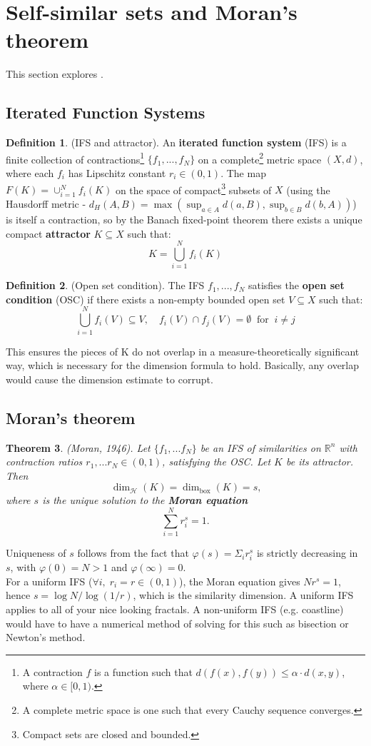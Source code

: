 \documentclass[11pt, a4paper]{article}
\theoremstyle{plain}
\newtheorem{theorem}{Theorem}[section]
\theoremstyle{definition}
\newtheorem{definition}[theorem]{Definition}
\theoremstyle{remark}
\newcommand{\Hd}{\dim_{\mathcal{H}}}     %
\newcommand{\Bd}{\dim_{\mathrm{box}}}    %
\begin{document}
\section{Self-similar sets and Moran's theorem}
This section explores \cite{fernandezmartinez2016moran}.
\subsection{Iterated Function Systems}
\begin{definition}{(IFS and attractor).}
    An \textbf{iterated function system} (IFS) is a finite collection of contractions\footnote{A contraction $f$ is a function such that $d(f(x), f(y))\leq\alpha\cdot d(x,y)$, where $\alpha\in[0,1)$.} $\{f_1,...,f_N\}$ on a complete\footnote{A complete metric space is one such that every Cauchy sequence converges.} metric space $(X, d)$, where each $f_i$ has Lipschitz constant $r_i\in(0,1)$. The map $F(K)=\cup_{i=1}^Nf_i(K)$ on the space of compact\footnote{Compact sets are closed and bounded.} subsets of $X$ (using the Hausdorff metric - $d_H(A, B) = \max(\sup_{a\in A}d(a, B), \sup_{b\in B}d(b, A))$) is itself a contraction, so by the Banach fixed-point theorem there exists a unique compact \textbf{attractor} $K\subseteq X$ such that:
    \[
    K = \bigcup\limits_{i=1}^Nf_i(K)
    \]
\end{definition}
\begin{definition}{(Open set condition).}
    The IFS ${f_1,...,f_N}$ satisfies the \textbf{open set condition} (OSC) if there exists a non-empty bounded open set $V\subseteq X$ such that:
    \[
    \bigcup\limits_{i=1}^Nf_i(V)\subseteq V, \quad f_i(V)\cap f_j(V)=\emptyset \;\;\text{for}\;\; i\neq j
    \]
\end{definition}
This ensures the pieces of K do not overlap in a measure-theoretically significant way, which is necessary for the dimension formula to hold. Basically, any overlap would cause the dimension estimate to corrupt.

\subsection{Moran's theorem}
\begin{theorem}{(Moran, 1946).}
    Let $\{f_1,...f_N\}$ be an IFS of similarities on $\mathbb{R}^n$ with contraction ratios $r_1,...r_N\in (0,1)$, satisfying the OSC. Let $K$ be its attractor. Then
    \[
    \Hd(K)=\Bd(K)=s\text{,}
    \]
    where $s$ is the unique solution to the \textbf{Moran equation}
    \[
    \sum\limits_{i=1}^Nr_i^s=1.
    \]
\end{theorem}
Uniqueness of $s$ follows from the fact that $\varphi(s)=\Sigma_ir_i^s$ is strictly decreasing in $s$, with $\varphi(0)=N>1$ and $\varphi(\infty)=0$.\\
For a uniform IFS ($\forall i,\; r_i=r\in (0,1)$), the Moran equation gives $Nr^s=1$, hence $s=\log N/\log(1/r)$, which is the similarity dimension. A uniform IFS applies to all of your nice looking fractals. A non-uniform IFS (e.g. coastline) would have to have a numerical method of solving for this such as bisection or Newton's method.
\end{document}
